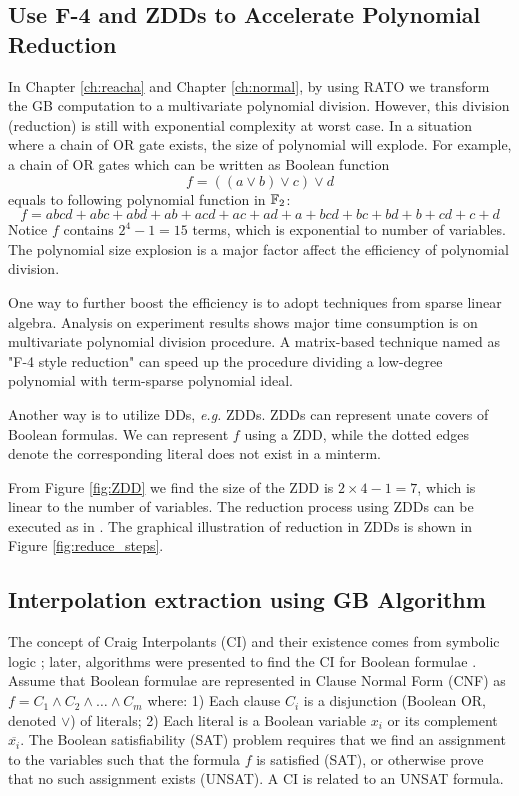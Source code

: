 \subsection{Use F-4 and ZDDs to Accelerate Polynomial Reduction}
In Chapter \ref{ch:reacha} and Chapter \ref{ch:normal}, by using RATO we transform the GB 
computation to a multivariate polynomial division. However, this division (reduction)
is still with exponential complexity at worst case. In a situation where 
a chain of OR gate exists, the size of polynomial will explode. For example, a chain of OR gates 
which can be written as Boolean function 
$$f = ((a\lor b) \lor c) \lor d$$
equals to following polynomial function in ${\mathbb{F}}_2$:
$$f = abcd+abc+abd+ab+acd+ac+ad+a+bcd+bc+bd+b+cd+c+d$$
Notice $f$ contains $2^4-1 = 15$ terms, which is exponential to number of variables.
The polynomial size explosion is a major factor affect the efficiency of polynomial division.

One way to further boost the efficiency is to adopt techniques from sparse linear algebra.
Analysis on experiment results shows major time consumption is on multivariate polynomial division procedure.
A matrix-based technique named as "F-4 style reduction" \cite{f4} can speed up the procedure
dividing a low-degree polynomial with term-sparse polynomial ideal. 

Another way is to utilize DDs, {\it e.g.} ZDDs. ZDDs can represent unate covers of Boolean formulas.
We can represent $f$ using a ZDD, while the dotted edges denote the corresponding literal does not 
exist in a minterm.


From Figure \ref{fig:ZDD} we find the size of the ZDD is $2\times4 -1 = 7$, which is linear to the number of variables.
The reduction process using ZDDs can be executed as in \cite{polybori:2009}. The graphical illustration 
of reduction in ZDDs is shown in Figure \ref{fig:reduce_steps}. 


\subsection{Interpolation extraction using GB Algorithm}
The concept of Craig Interpolants (CI) and their existence comes from
symbolic logic \cite{craig-interpolate}; later, algorithms were
presented to find the CI for Boolean formulae
\cite{pudlak:ci} \cite{mcmillan:interpolation}. Assume that Boolean
formulae are represented in Clause Normal Form (CNF) as 
$f = C_1 \wedge C_2 \wedge \dots \wedge C_m$ where: 1) Each clause
$C_i$ is a disjunction (Boolean OR, denoted $\vee$) of literals; 2)
Each literal is a Boolean variable $x_i$ or its complement
$\overline{x_i}$. 
The Boolean satisfiability (SAT) problem requires that we find an
assignment to the variables such that the formula $f$ is satisfied
(SAT), or otherwise prove that no such assignment exists (UNSAT). 
A CI is related to an UNSAT formula. 

